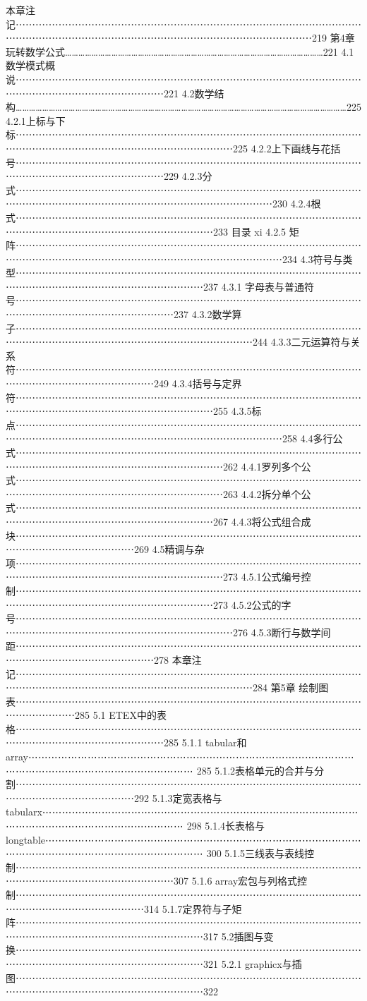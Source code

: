 \documentclass[UTF8]{ctexart}
\begin{document}
本章注记⋯⋯⋯⋯⋯⋯⋯⋯⋯⋯⋯⋯⋯⋯⋯⋯⋯⋯⋯⋯⋯⋯⋯⋯⋯⋯⋯⋯⋯⋯⋯⋯⋯⋯⋯⋯⋯⋯⋯⋯⋯⋯⋯⋯⋯⋯⋯⋯⋯⋯⋯⋯⋯⋯⋯⋯⋯⋯⋯⋯⋯⋯⋯⋯⋯⋯219
第4章	玩转数学公式………………………………………………………………………………………………………221
4.1数学模式概说⋯⋯⋯⋯⋯⋯⋯⋯⋯⋯⋯⋯⋯⋯⋯⋯⋯⋯⋯⋯⋯⋯⋯⋯⋯⋯⋯⋯⋯⋯⋯⋯⋯⋯⋯⋯⋯⋯⋯⋯⋯⋯⋯⋯⋯⋯⋯⋯⋯⋯⋯221
4.2数学结构……………………………………………………………………………………………………………………………………225
4.2.1上标与下标⋯⋯⋯⋯⋯⋯⋯⋯⋯⋯⋯⋯⋯⋯⋯⋯⋯⋯⋯⋯⋯⋯⋯⋯⋯⋯⋯⋯⋯⋯⋯⋯⋯⋯⋯⋯⋯⋯⋯⋯⋯⋯⋯⋯⋯⋯⋯⋯⋯⋯⋯⋯⋯⋯⋯⋯⋯⋯225
4.2.2上下画线与花括号⋯⋯⋯⋯⋯⋯⋯⋯⋯⋯⋯⋯⋯⋯⋯⋯⋯⋯⋯⋯⋯⋯⋯⋯⋯⋯⋯⋯⋯⋯⋯⋯⋯⋯⋯⋯⋯⋯⋯⋯⋯⋯⋯⋯⋯⋯⋯⋯⋯⋯⋯229
4.2.3分式⋯⋯⋯⋯⋯⋯⋯⋯⋯⋯⋯⋯⋯⋯⋯⋯⋯⋯⋯⋯⋯⋯⋯⋯⋯⋯⋯⋯⋯⋯⋯⋯⋯⋯⋯⋯⋯⋯⋯⋯⋯⋯⋯⋯⋯⋯⋯⋯⋯⋯⋯⋯⋯⋯⋯⋯⋯⋯⋯⋯⋯⋯230
4.2.4根式⋯⋯⋯⋯⋯⋯⋯⋯⋯⋯⋯⋯⋯⋯⋯⋯⋯⋯⋯⋯⋯⋯⋯⋯⋯⋯⋯⋯⋯⋯⋯⋯⋯⋯⋯⋯⋯⋯⋯⋯⋯⋯⋯⋯⋯⋯⋯⋯⋯⋯⋯⋯⋯⋯⋯⋯233
目录	xi
4.2.5 矩阵⋯⋯⋯⋯⋯⋯⋯⋯⋯⋯⋯⋯⋯⋯⋯⋯⋯⋯⋯⋯⋯⋯⋯⋯⋯⋯⋯⋯⋯⋯⋯⋯⋯⋯⋯⋯⋯⋯⋯⋯⋯⋯⋯⋯⋯⋯⋯⋯⋯⋯⋯⋯⋯⋯⋯⋯⋯⋯⋯⋯⋯⋯⋯234
4.3符号与类型⋯⋯⋯⋯⋯⋯⋯⋯⋯⋯⋯⋯⋯⋯⋯⋯⋯⋯⋯⋯⋯⋯⋯⋯⋯⋯⋯⋯⋯⋯⋯⋯⋯⋯⋯⋯⋯⋯⋯⋯⋯⋯⋯⋯⋯⋯⋯⋯⋯⋯⋯⋯⋯⋯⋯237
4.3.1 字母表与普通符号⋯⋯⋯⋯⋯⋯⋯⋯⋯⋯⋯⋯⋯⋯⋯⋯⋯⋯⋯⋯⋯⋯⋯⋯⋯⋯⋯⋯⋯⋯⋯⋯⋯⋯⋯⋯⋯⋯⋯⋯⋯⋯⋯⋯⋯⋯⋯⋯⋯⋯⋯⋯237
4.3.2数学算子⋯⋯⋯⋯⋯⋯⋯⋯⋯⋯⋯⋯⋯⋯⋯⋯⋯⋯⋯⋯⋯⋯⋯⋯⋯⋯⋯⋯⋯⋯⋯⋯⋯⋯⋯⋯⋯⋯⋯⋯⋯⋯⋯⋯⋯⋯⋯⋯⋯⋯⋯⋯⋯⋯⋯⋯⋯⋯⋯⋯244
4.3.3二元运算符与关系符⋯⋯⋯⋯⋯⋯⋯⋯⋯⋯⋯⋯⋯⋯⋯⋯⋯⋯⋯⋯⋯⋯⋯⋯⋯⋯⋯⋯⋯⋯⋯⋯⋯⋯⋯⋯⋯⋯⋯⋯⋯⋯⋯⋯⋯⋯⋯⋯⋯⋯249
4.3.4括号与定界符⋯⋯⋯⋯⋯⋯⋯⋯⋯⋯⋯⋯⋯⋯⋯⋯⋯⋯⋯⋯⋯⋯⋯⋯⋯⋯⋯⋯⋯⋯⋯⋯⋯⋯⋯⋯⋯⋯⋯⋯⋯⋯⋯⋯⋯⋯⋯⋯⋯⋯⋯⋯⋯⋯⋯⋯255
4.3.5标点⋯⋯⋯⋯⋯⋯⋯⋯⋯⋯⋯⋯⋯⋯⋯⋯⋯⋯⋯⋯⋯⋯⋯⋯⋯⋯⋯⋯⋯⋯⋯⋯⋯⋯⋯⋯⋯⋯⋯⋯⋯⋯⋯⋯⋯⋯⋯⋯⋯⋯⋯⋯⋯⋯⋯⋯⋯⋯⋯⋯⋯⋯⋯258
4.4多行公式⋯⋯⋯⋯⋯⋯⋯⋯⋯⋯⋯⋯⋯⋯⋯⋯⋯⋯⋯⋯⋯⋯⋯⋯⋯⋯⋯⋯⋯⋯⋯⋯⋯⋯⋯⋯⋯⋯⋯⋯⋯⋯⋯⋯⋯⋯⋯⋯⋯⋯⋯⋯⋯⋯⋯⋯⋯262
4.4.1罗列多个公式⋯⋯⋯⋯⋯⋯⋯⋯⋯⋯⋯⋯⋯⋯⋯⋯⋯⋯⋯⋯⋯⋯⋯⋯⋯⋯⋯⋯⋯⋯⋯⋯⋯⋯⋯⋯⋯⋯⋯⋯⋯⋯⋯⋯⋯⋯⋯⋯⋯⋯⋯⋯⋯⋯⋯⋯⋯263
4.4.2拆分单个公式⋯⋯⋯⋯⋯⋯⋯⋯⋯⋯⋯⋯⋯⋯⋯⋯⋯⋯⋯⋯⋯⋯⋯⋯⋯⋯⋯⋯⋯⋯⋯⋯⋯⋯⋯⋯⋯⋯⋯⋯⋯⋯⋯⋯⋯⋯⋯⋯⋯⋯⋯⋯⋯⋯⋯⋯267
4.4.3将公式组合成块⋯⋯⋯⋯⋯⋯⋯⋯⋯⋯⋯⋯⋯⋯⋯⋯⋯⋯⋯⋯⋯⋯⋯⋯⋯⋯⋯⋯⋯⋯⋯⋯⋯⋯⋯⋯⋯⋯⋯⋯⋯⋯⋯⋯⋯⋯⋯⋯269
4.5精调与杂项⋯⋯⋯⋯⋯⋯⋯⋯⋯⋯⋯⋯⋯⋯⋯⋯⋯⋯⋯⋯⋯⋯⋯⋯⋯⋯⋯⋯⋯⋯⋯⋯⋯⋯⋯⋯⋯⋯⋯⋯⋯⋯⋯⋯⋯⋯⋯⋯⋯⋯⋯⋯⋯⋯⋯⋯⋯273
4.5.1公式编号控制⋯⋯⋯⋯⋯⋯⋯⋯⋯⋯⋯⋯⋯⋯⋯⋯⋯⋯⋯⋯⋯⋯⋯⋯⋯⋯⋯⋯⋯⋯⋯⋯⋯⋯⋯⋯⋯⋯⋯⋯⋯⋯⋯⋯⋯⋯⋯⋯⋯⋯⋯⋯⋯⋯⋯⋯273
4.5.2公式的字号⋯⋯⋯⋯⋯⋯⋯⋯⋯⋯⋯⋯⋯⋯⋯⋯⋯⋯⋯⋯⋯⋯⋯⋯⋯⋯⋯⋯⋯⋯⋯⋯⋯⋯⋯⋯⋯⋯⋯⋯⋯⋯⋯⋯⋯⋯⋯⋯⋯⋯⋯⋯⋯⋯⋯⋯⋯⋯276
4.5.3断行与数学间距⋯⋯⋯⋯⋯⋯⋯⋯⋯⋯⋯⋯⋯⋯⋯⋯⋯⋯⋯⋯⋯⋯⋯⋯⋯⋯⋯⋯⋯⋯⋯⋯⋯⋯⋯⋯⋯⋯⋯⋯⋯⋯⋯⋯⋯⋯⋯⋯⋯⋯278
本章注记⋯⋯⋯⋯⋯⋯⋯⋯⋯⋯⋯⋯⋯⋯⋯⋯⋯⋯⋯⋯⋯⋯⋯⋯⋯⋯⋯⋯⋯⋯⋯⋯⋯⋯⋯⋯⋯⋯⋯⋯⋯⋯⋯⋯⋯⋯⋯⋯⋯⋯⋯⋯⋯⋯⋯⋯⋯⋯⋯⋯284
第5章	绘制图表⋯⋯⋯⋯⋯⋯⋯⋯⋯⋯⋯⋯⋯⋯⋯⋯⋯⋯⋯⋯⋯⋯⋯⋯⋯⋯⋯⋯⋯⋯⋯⋯⋯⋯⋯⋯⋯⋯⋯⋯⋯⋯285
5.1 ETEX中的表格⋯⋯⋯⋯⋯⋯⋯⋯⋯⋯⋯⋯⋯⋯⋯⋯⋯⋯⋯⋯⋯⋯⋯⋯⋯⋯⋯⋯⋯⋯⋯⋯⋯⋯⋯⋯⋯⋯⋯⋯⋯⋯⋯⋯⋯⋯⋯⋯⋯⋯⋯285
5.1.1 tabular和array⋯⋯⋯⋯⋯⋯⋯⋯⋯⋯⋯⋯⋯⋯⋯⋯⋯⋯⋯⋯⋯⋯⋯⋯⋯⋯⋯⋯⋯⋯⋯⋯⋯⋯⋯⋯⋯⋯⋯⋯⋯⋯⋯⋯⋯⋯⋯⋯⋯⋯⋯⋯ 285
5.1.2表格单元的合并与分割⋯⋯⋯⋯⋯⋯⋯⋯⋯⋯⋯⋯⋯⋯⋯⋯⋯⋯⋯⋯⋯⋯⋯⋯⋯⋯⋯⋯⋯⋯⋯⋯⋯⋯⋯⋯⋯⋯⋯⋯⋯⋯⋯⋯⋯⋯⋯⋯292
5.1.3定宽表格与tabularx⋯⋯⋯⋯⋯⋯⋯⋯⋯⋯⋯⋯⋯⋯⋯⋯⋯⋯⋯⋯⋯⋯⋯⋯⋯⋯⋯⋯⋯⋯⋯⋯⋯⋯⋯⋯⋯⋯⋯⋯⋯⋯⋯⋯⋯⋯⋯⋯⋯⋯ 298
5.1.4长表格与longtable⋯⋯⋯⋯⋯⋯⋯⋯⋯⋯⋯⋯⋯⋯⋯⋯⋯⋯⋯⋯⋯⋯⋯⋯⋯⋯⋯⋯⋯⋯⋯⋯⋯⋯⋯⋯⋯⋯⋯⋯⋯⋯⋯⋯⋯⋯⋯⋯⋯⋯⋯⋯ 300
5.1.5三线表与表线控制⋯⋯⋯⋯⋯⋯⋯⋯⋯⋯⋯⋯⋯⋯⋯⋯⋯⋯⋯⋯⋯⋯⋯⋯⋯⋯⋯⋯⋯⋯⋯⋯⋯⋯⋯⋯⋯⋯⋯⋯⋯⋯⋯⋯⋯⋯⋯⋯⋯⋯⋯⋯307
5.1.6 array宏包与列格式控制⋯⋯⋯⋯⋯⋯⋯⋯⋯⋯⋯⋯⋯⋯⋯⋯⋯⋯⋯⋯⋯⋯⋯⋯⋯⋯⋯⋯⋯⋯⋯⋯⋯⋯⋯⋯⋯⋯⋯⋯⋯⋯⋯⋯⋯⋯⋯⋯⋯314
5.1.7定界符与子矩阵⋯⋯⋯⋯⋯⋯⋯⋯⋯⋯⋯⋯⋯⋯⋯⋯⋯⋯⋯⋯⋯⋯⋯⋯⋯⋯⋯⋯⋯⋯⋯⋯⋯⋯⋯⋯⋯⋯⋯⋯⋯⋯⋯⋯⋯⋯⋯⋯⋯⋯⋯⋯⋯⋯⋯317
5.2插图与变换⋯⋯⋯⋯⋯⋯⋯⋯⋯⋯⋯⋯⋯⋯⋯⋯⋯⋯⋯⋯⋯⋯⋯⋯⋯⋯⋯⋯⋯⋯⋯⋯⋯⋯⋯⋯⋯⋯⋯⋯⋯⋯⋯⋯⋯⋯⋯⋯⋯⋯⋯⋯⋯⋯⋯321
5.2.1 graphicx与插图⋯⋯⋯⋯⋯⋯⋯⋯⋯⋯⋯⋯⋯⋯⋯⋯⋯⋯⋯⋯⋯⋯⋯⋯⋯⋯⋯⋯⋯⋯⋯⋯⋯⋯⋯⋯⋯⋯⋯⋯⋯⋯⋯⋯⋯⋯⋯⋯⋯⋯⋯⋯⋯⋯⋯322
\end{document}
